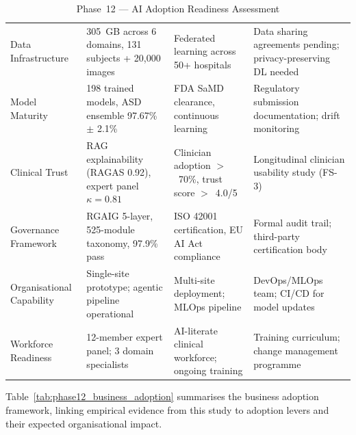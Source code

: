 \begingroup\singlespacing\tablefontsize\tablestripes
\begin{xltabular}{\textwidth}{@{} p{0.18\textwidth} X X X @{}}
\caption{Phase~12 --- AI Adoption Readiness Assessment}
\label{tab:phase12_ai_readiness}\\
\toprule
{} &  &  &  \\
\midrule
\endfirsthead
\endhead
\bottomrule
\endlastfoot
Data Infrastructure       & 305~GB across 6 domains, 131 subjects + 20{,}000 images                                          & Federated learning across 50+ hospitals                                  & Data sharing agreements pending; privacy-preserving DL needed \\
\addlinespace
Model Maturity            & 198 trained models, ASD ensemble 97.67\% $\pm$ 2.1\%                                     & FDA SaMD clearance, continuous learning                                  & Regulatory submission documentation; drift monitoring \\
\addlinespace
Clinical Trust            & RAG explainability (RAGAS 0.92), expert panel $\kappa = 0.81$                    & Clinician adoption $>$~70\%, trust score $>$~4.0/5                       & Longitudinal clinician usability study (FS-3) \\
\addlinespace
Governance Framework      & RGAIG 5-layer, 525-module taxonomy, 97.9\% pass                                 & ISO 42001 certification, EU AI Act compliance                            & Formal audit trail; third-party certification body \\
\addlinespace
Organisational Capability & Single-site prototype; agentic pipeline operational                              & Multi-site deployment; MLOps pipeline                                    & DevOps/MLOps team; CI/CD for model updates \\
\addlinespace
Workforce Readiness       & 12-member expert panel; 3 domain specialists                                    & AI-literate clinical workforce; ongoing training                         & Training curriculum; change management programme \\
\end{xltabular}
\endgroup

\vspace{1.5em}

Table~\ref{tab:phase12_business_adoption} summarises the business adoption framework, linking empirical evidence from this study to adoption levers and their expected organisational impact.

